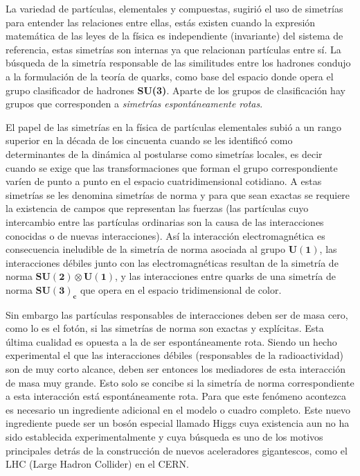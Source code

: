 
La variedad de partículas, elementales y compuestas, sugirió el uso de simetrías para entender las relaciones entre ellas, estás existen cuando la expresión matemática de las leyes de la física es independiente (invariante) del sistema de referencia, estas simetrías son internas ya que relacionan partículas entre sí. La búsqueda de la simetría responsable de las similitudes entre los hadrones condujo a la formulación de la teoría de quarks, como base del espacio donde opera el grupo clasificador de hadrones \textbf{SU(3)}. Aparte de los grupos de clasificación hay grupos que corresponden a \textit{simetrías espontáneamente rotas}. 

El papel de las simetrías  en la física de partículas elementales subió a un rango superior en la década de los cincuenta cuando se les identificó  como determinantes de la dinámica al postularse como simetrías locales, es decir cuando se exige que las transformaciones que forman el grupo correspondiente varíen de punto a punto en el espacio cuatridimensional cotidiano. A estas simetrías se les denomina simetrías de norma y para que sean exactas se requiere la existencia de campos que representan las fuerzas (las partículas cuyo intercambio entre las partículas ordinarias son la causa de las interacciones conocidas o de nuevas interacciones). Así la interacción electromagnética es consecuencia ineludible de la simetría de norma asociada al grupo $\mathbf{U(1)}$, las interacciones débiles junto con las electromagnéticas resultan de la simetría de norma $\mathbf{SU(2) \otimes U(1)}$, y las interacciones entre quarks de una simetría de norma $\mathbf{SU(3)_c}$ que opera en el espacio tridimensional de color.
    
Sin embargo las partículas responsables de interacciones deben ser de masa cero, como lo es el fotón,  si las simetrías de norma son exactas y explícitas. Esta última cualidad es opuesta a la de ser espontáneamente rota. Siendo un hecho experimental el que las interacciones débiles (responsables de la radioactividad) son de muy corto alcance, deben ser entonces los mediadores de esta interacción de masa muy grande. Esto solo se concibe si la simetría de norma correspondiente a esta interacción está espontáneamente rota. Para que este fenómeno acontezca es necesario un ingrediente adicional en el modelo o cuadro completo. Este nuevo ingrediente puede ser un bosón especial llamado Higgs cuya existencia aun no ha sido establecida experimentalmente y cuya búsqueda es uno de los motivos principales detrás de la construcción de nuevos aceleradores gigantescos, como el LHC (Large Hadron Collider) en el CERN.

